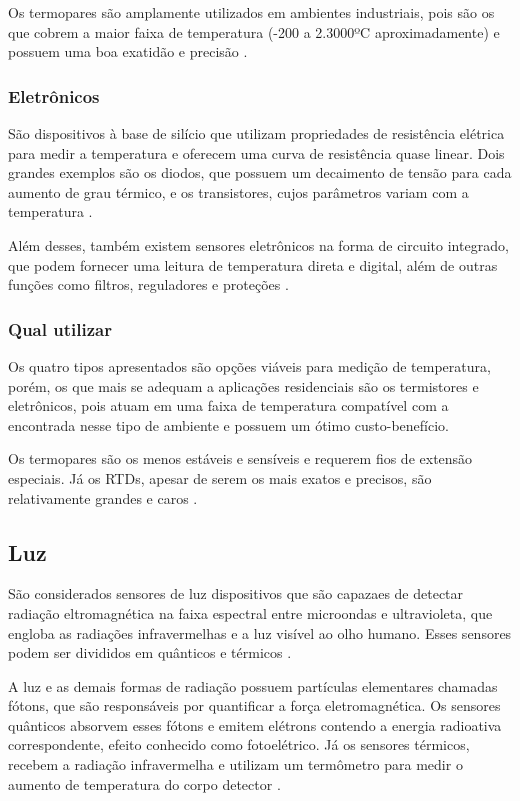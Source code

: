 Os termopares são amplamente utilizados em ambientes industriais, pois são os que cobrem a maior faixa de
temperatura (-200 a 2.3000ºC aproximadamente) e possuem uma boa exatidão e precisão
\cite{thomazini_albuquerque2005}.

\subsubsection{Eletrônicos}
São dispositivos à base de silício que utilizam propriedades de resistência elétrica para medir a temperatura
e oferecem uma curva de resistência quase linear. Dois grandes exemplos são os diodos, que possuem um
decaimento de tensão para cada aumento de grau térmico, e os transistores, cujos parâmetros variam com a
temperatura \cite{thomazini_albuquerque2005}.

Além desses, também existem sensores eletrônicos na forma de circuito integrado, que podem fornecer uma
leitura de temperatura direta e digital, além de outras funções como filtros, reguladores e proteções
\cite{fontes2005,thomazini_albuquerque2005}.

\subsubsection{Qual utilizar}
Os quatro tipos apresentados são opções viáveis para medição de temperatura, porém, os que mais se adequam a
aplicações residenciais são os termistores e eletrônicos, pois atuam em uma faixa de temperatura compatível
com a encontrada nesse tipo de ambiente e possuem um ótimo custo-benefício.

Os termopares são os menos estáveis e sensíveis e requerem fios de extensão especiais. Já os RTDs, apesar de
serem os mais exatos e precisos, são relativamente grandes e caros \cite{fontes2005}.

\subsection{Luz}
São considerados sensores de luz dispositivos que são capazaes de detectar radiação eltromagnética na faixa
espectral entre microondas e ultravioleta, que engloba as radiações infravermelhas e a luz visível ao olho
humano. Esses sensores podem ser divididos em quânticos e térmicos \cite{fraden2010}.

A luz e as demais formas de radiação possuem partículas elementares chamadas fótons, que são responsáveis por
quantificar a força eletromagnética. Os sensores quânticos absorvem esses fótons e emitem elétrons contendo a
energia radioativa correspondente, efeito conhecido como fotoelétrico. Já os sensores térmicos, recebem a
radiação infravermelha e utilizam um termômetro para medir o aumento de temperatura do corpo detector \cite{kenny2005}.

